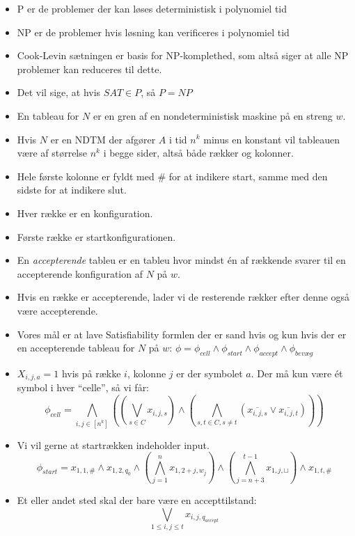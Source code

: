 \begin{itemize}

	\item P er de problemer der kan løses deterministisk i polynomiel tid
	\item NP er de problemer hvis løsning kan verificeres i polynomiel tid
	\item Cook-Levin sætningen er basis for NP-komplethed, som altså siger at alle NP problemer kan reduceres til dette.
	\item Det vil sige, at hvis $SAT \in P$, så $P = NP$
	\item En tableau for $N$ er en gren af en nondeterministisk maskine på en streng $w$.
	\item Hvis $N$ er en NDTM der afgører $A$ i tid $n^{k}$ minus en konstant vil tableauen være af størrelse $n^{k}$ i begge sider, altså både rækker og kolonner.
	\item Hele første kolonne er fyldt med \# for at indikere start, samme med den sidste for at indikere slut.
	\item Hver række er en konfiguration.
	\item Første række er startkonfigurationen.
	\item En \textit{accepterende} tableu er en tableu hvor mindst én af rækkende svarer til en accepterende konfiguration af $N$ på $w$.
	\item Hvis en række er accepterende, lader vi de resterende rækker efter denne også være accepterende.
	\item Vores mål er at lave Satisfiability formlen der er sand hvis og kun hvis der er en accepterende tableau for $N$ på $w$: $\phi = \phi_{cell} \wedge \phi_{start} \wedge \phi_{accept} \wedge \phi_{bevæg}$
	\item $X_{i,j,a} = 1$ hvis på række $i$, kolonne $j$ er der symbolet $a$. Der må kun være ét symbol i hver ``celle'', så vi får:
	      \begin{equation*}
		      \phi_{cell} = \bigwedge_{i,j \in [n^{k}]} \left( \left(   \bigvee_{s\in C} x_{i,j,s} \right) \wedge \left( \bigwedge_{s,t \in C, s \ne t} (\overline{x_{i,j,s}} \vee \overline{x_{i,j,t}}) \right)\right)
	      \end{equation*}
	\item Vi vil gerne at startrækken indeholder input.
	      \begin{equation*}
		      \phi_{start} = x_{1,1,\#} \wedge x_{1,2,q_{0}} \wedge \left( \bigwedge_{j=1}^{n} x_{1,2+j,w_{j}}  \right) \wedge \left( \bigwedge_{j=n+3}^{t-1} x_{1,j,\sqcup} \right) \wedge x_{1,t,\#}
	      \end{equation*}
	\item Et eller andet sted skal der bare være en accepttilstand:
	      \begin{equation*}
		      \bigvee_{1 \le i,j \le t} x_{i,j,q_{accept}}
	      \end{equation*}


\end{itemize}
